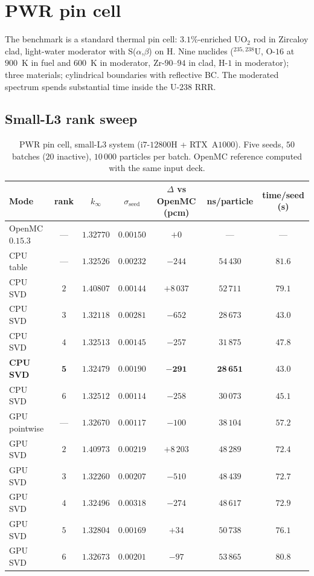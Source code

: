 \section{PWR pin cell}
\label{sec:pwr}

The benchmark is a standard thermal pin cell: $3.1\%$-enriched
UO$_2$ rod in Zircaloy clad, light-water moderator with
S($\alpha$,$\beta$) on H. Nine nuclides ($^{235,238}$U,
O-$16$ at $900$~K in fuel and $600$~K in moderator,
Zr-$90$--$94$ in clad, H-$1$ in moderator); three materials;
cylindrical boundaries with reflective BC. The moderated
spectrum spends substantial time inside the U-$238$ RRR.

\subsection{Small-L3 rank sweep}

\begin{table}[t]
\centering
\caption{PWR pin cell, small-L3 system (i$7$-$12800$H +
RTX~A$1000$). Five seeds, $50$ batches ($20$ inactive),
$10\,000$ particles per batch. OpenMC reference computed
with the same input deck.}
\label{tab:keff_pwr}
\begin{tabular}{@{}lcccccc@{}}
\toprule
Mode & rank & $k_\infty$ & $\sigma_\text{seed}$ &
$\Delta$ vs OpenMC (pcm) & ns/particle & time/seed (s) \\
\midrule
OpenMC $0.15.3$    & ---  & $1.32770$ & $0.00150$ & $+0$      & ---       & ---  \\
CPU table          & ---  & $1.32526$ & $0.00232$ & $-244$    & $54\,430$ & $81.6$ \\
CPU SVD            & $2$  & $1.40807$ & $0.00144$ & $+8\,037$ & $52\,711$ & $79.1$ \\
CPU SVD            & $3$  & $1.32118$ & $0.00281$ & $-652$    & $28\,673$ & $43.0$ \\
CPU SVD            & $4$  & $1.32513$ & $0.00145$ & $-257$    & $31\,875$ & $47.8$ \\
\textbf{CPU SVD}   & $\mathbf{5}$ & $\mathbf{1.32479}$ &
 $\mathbf{0.00190}$ & $\mathbf{-291}$ & $\mathbf{28\,651}$ & $\mathbf{43.0}$ \\
CPU SVD            & $6$  & $1.32512$ & $0.00114$ & $-258$    & $30\,073$ & $45.1$ \\
GPU pointwise      & ---  & $1.32670$ & $0.00117$ & $-100$    & $38\,104$ & $57.2$ \\
GPU SVD            & $2$  & $1.40973$ & $0.00219$ & $+8\,203$ & $48\,289$ & $72.4$ \\
GPU SVD            & $3$  & $1.32260$ & $0.00207$ & $-510$    & $48\,439$ & $72.7$ \\
GPU SVD            & $4$  & $1.32496$ & $0.00318$ & $-274$    & $48\,617$ & $72.9$ \\
GPU SVD            & $5$  & $1.32804$ & $0.00169$ & $+34$     & $50\,738$ & $76.1$ \\
GPU SVD            & $6$  & $1.32673$ & $0.00201$ & $-97$     & $53\,865$ & $80.8$ \\
\bottomrule
\end{tabular}
\end{table}

